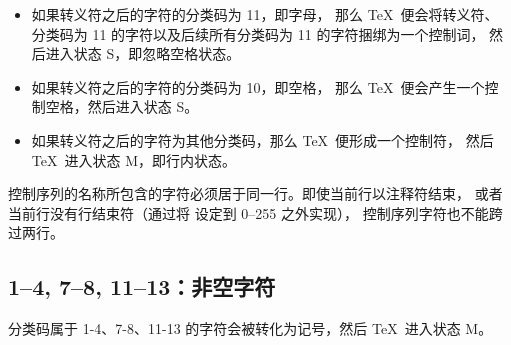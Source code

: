 \documentclass{book}
\begin{document}
\begin{itemize}
\item 如果转义符之后的字符的分类码为 11，即字母，
那么 \TeX\ 便会将转义符、分类码为 11 的字符以及后续所有分类码为 11 的字符捆绑为一个控制词，
然后进入状态 {\italic S}，即忽略空格状态。
\item 如果转义符之后的字符的分类码为 10，即空格，
那么 \TeX\ 便会产生一个控制空格，然后进入状态 {\italic S}。
\item 如果转义符之后的字符为其他分类码，那么 \TeX\ 便形成一个控制符，
然后 \TeX\ 进入状态 {\italic M}，即行内状态。
\end{itemize}

控制序列的名称所包含的字符必须居于同一行。即使当前行以注释符结束，
或者当前行没有行结束符（通过将  设定到 0--255 之外实现），
控制序列字符也不能跨过两行。

\subsection{1–4, 7–8, 11–13：非空字符}

分类码属于 1-4、7-8、11-13 的字符会被转化为记号，然后 \TeX\ 进入状态 {\italic M}。
\end{document}
